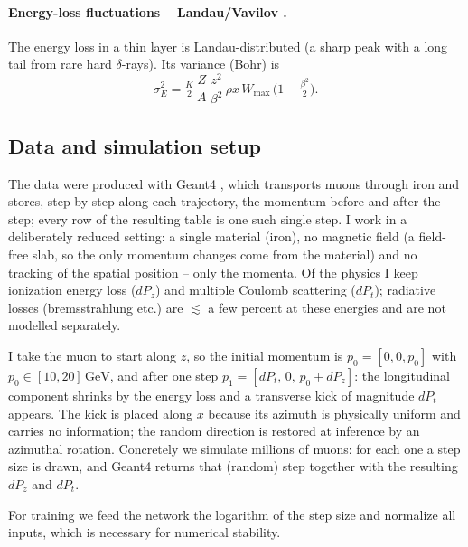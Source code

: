 \documentclass[11pt]{article}
\newcommand{\unit}[1]{\,\mathrm{#1}}
\begin{document}
\paragraph{Energy-loss fluctuations -- Landau/Vavilov \cite{landau}.}
The energy loss in a thin layer is Landau-distributed (a sharp peak with a long
tail from rare hard $\delta$-rays). Its variance (Bohr) is
\begin{equation}
  \sigma_E^2 = \tfrac{K}{2}\,\frac{Z}{A}\,\frac{z^2}{\beta^2}\,\rho x\,
               W_{\max}\,\big(1-\tfrac{\beta^2}{2}\big).
  \label{eq:vavilov}
\end{equation}

\subsection{Data and simulation setup}
The data were produced with Geant4 \cite{geant4}, which transports muons through
iron and stores, step by step along each trajectory, the momentum before and
after the step; every row of the resulting table is one such single step. I work
in a deliberately reduced setting: a single material (iron), no magnetic field
(a field-free slab, so the only momentum changes come from the material) and no
tracking of the spatial position -- only the momenta. Of the physics I keep
ionization energy loss ($dP_z$) and multiple Coulomb scattering ($dP_t$);
radiative losses (bremsstrahlung etc.) are $\lesssim$ a few percent at these
energies and are not modelled separately.

I take the muon to start along $z$, so the initial momentum is
$p_0=[0,0,p_0]$ with $p_0\in[10,20]\unit{GeV}$, and after one step
$p_1=[dP_t,\,0,\,p_0+dP_z]$: the longitudinal component shrinks by the energy
loss and a transverse kick of magnitude $dP_t$ appears. The kick is placed along
$x$ because its azimuth is physically uniform and carries no information; the
random direction is restored at inference by an azimuthal rotation. Concretely we
simulate millions of muons: for each one a step size is drawn, and Geant4 returns
that (random) step together with the resulting $dP_z$ and $dP_t$.

For training we feed the network the logarithm of the step size and normalize all
inputs, which is necessary for numerical stability.

\end{document}
